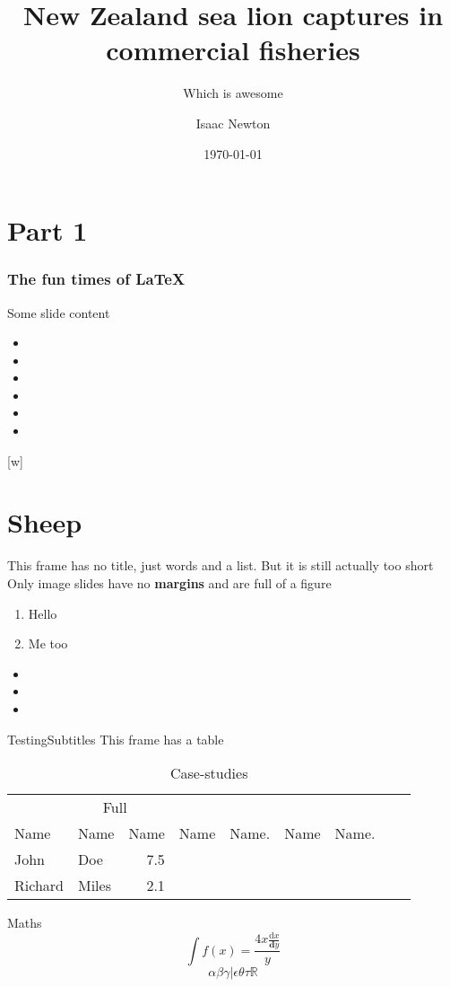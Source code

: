 \documentclass[xcolor={table}]{beamer}
\title{New Zealand sea lion captures in commercial fisheries}
\subtitle{Which is awesome}
\author{Isaac Newton}
\date{\today}
\begin{document}
\titleslide

\section{Part 1}

\begin{frame}
  \frametitle{The fun times of \LaTeX}
  Some slide content
\begin{itemize}
  \item \the\topmargin
  \item \the\headheight
  \item \the\headsep
  \item \the\textheight
  \item \the\footskip
  \item \the\paperheight
\end{itemize}
\end{frame}

[w]%

\section{Sheep}

\begin{frame}{This frame has no title, just words and a list. But it is still actually
  too short}
  Only image slides have no \textbf{margins} and are full of a figure


\begin{enumerate}
  \item Hello
  \item Me too
\end{enumerate}
\begin{itemize}
  \item \the\paperheight
  \item \the\footskip
  \item \the\textheight
\end{itemize}
 \end{frame}

 \begin{frame}{Testing}{Subtitles}
This frame has a table

\begin{table}[htbp]
\caption{Case-studies}
\centering
\begin{tabular}{llrllllll}
\toprule
\multicolumn{4}{c}{Full}  \\

\cmidrule(r){4-5}
\cmidrule(r){6-7}

Name & Name & Name & Name & Name. & Name & Name.  \\
\midrule
John & Doe & 7.5 \\
Richard & Miles & 2.1\\
\bottomrule
\end{tabular}
\label{case-studies}
\end{table}


 \end{frame}


 \begin{frame}{Maths}
$$
\int f(x) = \frac{4x \frac{\mathrm{d}x}{\textbf{d}y}}{y} 
$$
$$
\alpha\beta\gamma|\epsilon\theta\tau \mathbb{R}
$$
 \end{frame}
\end{document}
